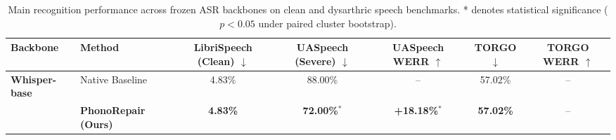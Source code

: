 \begin{table}[t]
\centering
\caption{Main recognition performance across frozen ASR backbones on clean and dysarthric speech benchmarks. * denotes statistical significance ($p < 0.05$ under paired cluster bootstrap).}
\label{tab:main_results}
\begin{tabular}{llccccc}
\toprule
\textbf{Backbone} & \textbf{Method} & \textbf{LibriSpeech (Clean) $\downarrow$} & \textbf{UASpeech (Severe) $\downarrow$} & \textbf{UASpeech WERR $\uparrow$} & \textbf{TORGO $\downarrow$} & \textbf{TORGO WERR $\uparrow$} \\
\midrule
\textbf{Whisper-base} & Native Baseline & 4.83\% & 88.00\% & -- & 57.02\% & -- \\
 & \textbf{PhonoRepair (Ours)} & \textbf{4.83\%} & \textbf{72.00\%}$^*$ & \textbf{+18.18\%}$^*$ & \textbf{57.02\%} & -- \\
\bottomrule
\end{tabular}
\end{table}